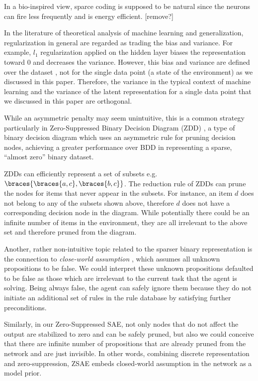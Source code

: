 In a bio-inspired view, sparce coding is supposed to be natural since
the neurons can fire less frequently and is energy efficient. [remove?]

In the literature of theoretical analysis of machine learning and generalization,
regularization in general are regarded as trading the bias and variance.
For example, $l_1$ regularization applied on the hidden layer biases the representation toward 0 and decreases the variance.
However, this bias and variance are defined over the dataset \cite{deeplearningbook},
not for the single data point (a state of the environment) as we discussed in this paper.
% 
Therefore, the variance in the typical context of machine learning and the variance of the latent representation
for a single data point that we discussed in this paper are orthogonal.

While an asymmetric penalty may seem unintuitive, this is a common
strategy particularly in Zero-Suppressed Binary Decision Diagram (ZDD)
\cite{minato1993zero}, a type of binary decision diagram \cite{bryant1986graph} which
uses an asymmetric rule for pruning decision nodes, achieving a greater
performance over BDD in representing a sparse, ``almost zero'' binary dataset.

ZDDs can efficiently represent a set of subsets e.g. $\braces{\braces{a,c},\braces{b,c}}$.
The reduction rule of ZDDs can prune the nodes for items that never appear in the subsets.
For instance, an item $d$ does not belong to any of the subsets shown above, therefore $d$ does not have
a corresponding decision node in the diagram.
While potentially there could be an infinite number of items in the environment, they are 
all irrelevant to the above set and therefore pruned from the diagram.

Another, rather non-intuitive topic related to the sparser binary representation
is the connection to \emph{close-world assumption} \cite{reiter1981closed}, which assumes all unknown
propositions to be false.
% 
We could interpret these unknown propositions defaulted to be false as those which are irrelevant
to the current task that the agent is solving.
Being always false, the agent can safely ignore them because
they do not initiate an additional set of rules in the rule database by satisfying further preconditions.

% 
Similarly, in our Zero-Suppressed SAE, not only nodes that do not affect the output are stabilized to zero
and can be safely pruned, but also we could conceive that there are infinite number of propositions
that are already pruned from the network and are just invisible.
In other words, combining discrete representation and zero-suppression,
ZSAE embeds closed-world assumption in the network as a model prior.


